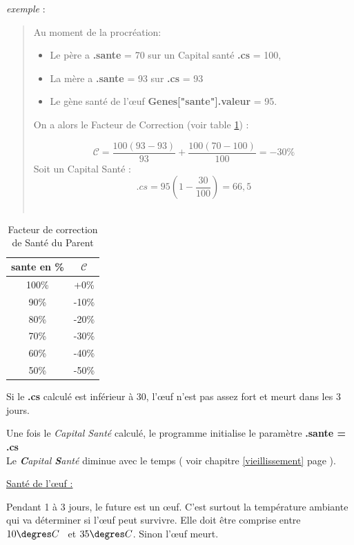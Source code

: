 \documentclass[french]{report}
\begin{document}
\textit{exemple} : \\
\begin{quote}
Au moment de la procréation:
\begin{itemize}
\item Le père a \textbf{.sante} =  70 sur un Capital santé \textbf{.cs} = 100,
\item La mère a \textbf{.sante} = 93 sur \textbf{.cs} = 93 
\item Le gène santé de l'œuf \textbf{Genes["sante"].valeur} = 95.\\
\end{itemize}

On a alors le Facteur de Correction (voir table \ref{table1}) :

 \[ \mathcal{C} = \frac{100(93 - 93)}{93} + \frac{100(70 - 100)}{100} = - 30 \% \]
Soit un Capital Santé : \\
\[ .cs = 95 ( 1 - \frac{30}{100}) = 66,5\]\\
\end{quote}


\begin{table}[h]
\begin{center}
\begin{tabular}{|c|c|}\hline
\rowcolor{yellow}\textbf{sante en \% }&  \textbf{$\mathcal{C}$}\\ \hline
100\% & +0\%\\
90\% & -10\%\\
80\% & -20\%\\
70\% & -30\%\\
60\% & -40\%\\
50\% & -50\%\\ \hline
\end{tabular}
\caption{Facteur de correction de Santé du Parent}\label{table1}
\end{center}
\end{table}
Si le \textbf{.cs} calculé est inférieur à 30, l'œuf n'est pas assez fort et meurt dans les 3 jours.

Une fois le \textit{Capital Santé} calculé, le programme initialise le paramètre \textbf{.sante = .cs}\\

Le \textit{\textbf{C}apital \textbf{S}anté} diminue avec le temps ( voir chapitre \ref{vieillissement} page \pageref{vieillissement}).
\begin{center}
\underline{Santé de l'œuf :}
\end{center}Pendant 1 à 3 jours, le future \CoCiX est un œuf. C'est surtout la température ambiante qui va déterminer si l'œuf peut survivre. Elle doit être comprise entre $10\degres C$ ~et $35\degres C$. Sinon l'œuf meurt.
\end{document}
